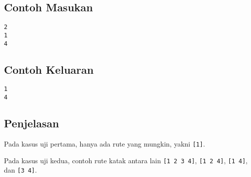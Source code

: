 \documentclass{article}
\begin{document}
\begin{multicols}{2}
\subsection*{Contoh Masukan}
\begin{lstlisting}
2
1
4
\end{lstlisting}
\columnbreak
\subsection*{Contoh Keluaran}
\begin{lstlisting}
1
4
\end{lstlisting}
\vfill
\null
\end{multicols}

\subsection*{Penjelasan}

Pada kasus uji pertama, hanya ada rute yang mungkin, yakni \lstinline{[1]}.

Pada kasus uji kedua, contoh rute katak antara lain \lstinline{[1 2 3 4]}, \lstinline{[1 2 4]}, \lstinline{[1 4]}, dan \lstinline{[3 4]}.

\pagebreak
\end{document}
